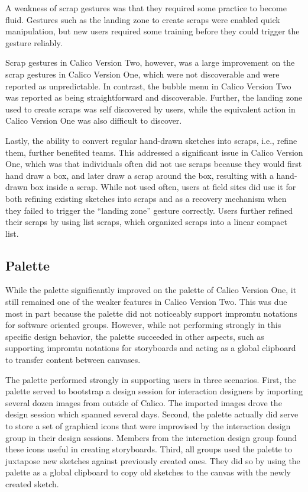 A weakness of scrap gestures was that they required some practice to become fluid. Gestures such as the landing zone to create scraps were enabled quick manipulation, but new users required some training before they could trigger the gesture reliably. 

Scrap gestures in Calico Version Two, however, was a large improvement on the scrap gestures in Calico Version One, which were not discoverable and were reported as unpredictable. In contrast, the bubble menu in Calico Version Two was reported as being straightforward and discoverable. Further, the landing zone used to create scraps was self discovered by users, while the equivalent action in Calico Version One was also difficult to discover. 

Lastly, the ability to convert regular hand-drawn sketches into scraps, i.e., refine them, further benefited teams. This addressed a significant issue in Calico Version One, which was that individuals often did not use scraps because they would first hand draw a box, and later draw a scrap around the box, resulting with a hand-drawn box inside a scrap. While not used often, users at field sites did use it for both refining existing sketches into scraps and as a recovery mechanism when they failed to trigger the ``landing zone'' gesture correctly.  Users further refined their scraps by using list scraps, which organized scraps into a linear compact list. 

\subsection{Palette}

While the palette significantly improved on the palette of Calico Version One, it still remained one of the weaker features in Calico Version Two. This was due most in part because the palette did not noticeably support impromtu notations for software oriented groups. However, while not performing strongly in this specific design behavior, the palette succeeded in other aspects, such as supporting impromtu notations for storyboards and acting as a global clipboard to transfer content between canvases.

The palette performed strongly in supporting users in three scenarios. First, the palette served to bootstrap a design session for interaction designers by importing several dozen images from outside of Calico. The imported images drove the design session which spanned several days. Second, the palette actually did serve to store a set of graphical icons that were improvised by the interaction design group in their design sessions. Members from the interaction design group found these icons useful in creating storyboards. Third, all groups used the palette to juxtapose new sketches against previously created ones. They did so by using the palette as a global clipboard to copy old sketches to the canvas with the newly created sketch.

